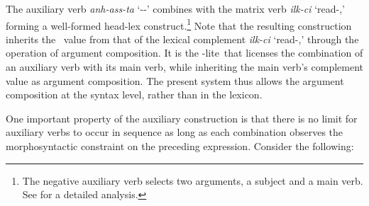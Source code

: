 \documentclass[output=paper]{langsci/langscibook}
\begin{document}
{\begin{exe}
\ex \small{}
\end{exe}


\noindent The auxiliary verb \emph{anh-ass-ta} `\NEG-\PST-\DECL' combines with the matrix verb {\it ilk-ci} `read-\conn,'
forming a well-formed head-lex construct.\footnote{The negative auxiliary
verb selects two arguments, a subject and a main verb. See \citet{Kim:16} for
a detailed analysis.}
Note that the resulting construction inherits the
\COMPS\ value from that of the lexical complement {\it ilk-ci} `read-\conn,' through the operation of argument composition.
It is the \hd-lite\ that licenses
the combination of an auxiliary verb with its main verb, while
inheriting the main verb's complement value as argument composition. The present system thus allows the argument composition at the syntax level, rather than
in the lexicon.

One important property of the auxiliary construction is that there is no limit for auxiliary verbs to
occur in sequence as long as each combination observes
the morphosyntactic constraint on the preceding expression. Consider
the following:



}
\end{document}
